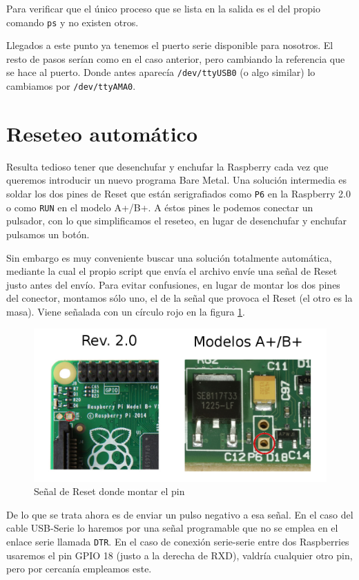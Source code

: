 Para verificar que el único proceso que se lista en la salida es el del propio comando {\tt ps}
y no existen otros.

Llegados a este punto ya tenemos el puerto serie disponible para nosotros. El resto de pasos
serían como en el caso anterior, pero cambiando la referencia que se hace al puerto. Donde
antes aparecía {\tt /dev/ttyUSB0} (o algo similar) lo cambiamos por {\tt /dev/ttyAMA0}.

\section{Reseteo automático}

Resulta tedioso tener que desenchufar y enchufar la Raspberry cada vez que queremos introducir
un nuevo programa Bare Metal. Una solución intermedia es soldar los dos pines de Reset que
están serigrafiados como {\tt P6} en la Raspberry 2.0 o como {\tt RUN} en el modelo A+/B+.
A éstos pines le podemos conectar un pulsador, con lo que simplificamos el reseteo, en lugar de
desenchufar y enchufar pulsamos un botón.

Sin embargo es muy conveniente buscar una solución totalmente automática, mediante la cual
el propio script que envía el archivo envíe una señal de Reset justo antes del envío. Para
evitar confusiones, en lugar de montar los dos pines del conector, montamos sólo uno, el
de la señal que provoca el Reset (el otro es la masa). Viene señalada con un círculo rojo
en la figura \ref{fig:pinReset}.

\begin{figure}[h]
  \centering
    \includegraphics[width=14cm]{graphs/pinReset.jpg}
  \caption{Señal de Reset donde montar el pin}
  \label{fig:pinReset}
\end{figure}

De lo que se trata ahora es de enviar un pulso negativo a esa señal. En el caso del cable
USB-Serie lo haremos por una señal programable que no se emplea en el enlace serie llamada
{\tt DTR}. En el caso de conexión serie-serie entre dos Raspberries usaremos el pin GPIO 18
(justo a la derecha de RXD), valdría cualquier otro pin, pero por cercanía empleamos este.

